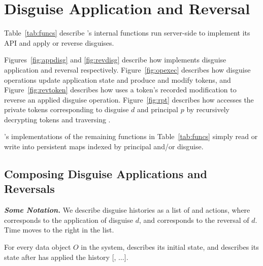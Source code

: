 \section{Disguise Application and Reversal}

Table~\ref{tab:funcs} describe \sys's internal functions run server-side to implement its API 
and apply or reverse disguises. 

Figures~\ref{fig:appdisg} and \ref{fig:revdisg} describe how \sys implements disguise application and
reversal respectively. Figure~\ref{fig:opexec} describes how disguise operations update application
state and produce and modify tokens, and 
Figure~\ref{fig:revtoken} describes how \sys uses a token's recorded
modification to reverse an applied disguise operation. 
Figure~\ref{fig:rpt} describes how \sys accesses the private tokens
corresponding to disguise $d$ and principal $p$ by recursively decrypting tokens and traversing
.

\sys's implementations of the remaining functions in Table~\ref{tab:funcs} simply read or write into
persistent maps indexed by principal and/or disguise.

\subsection{Composing Disguise Applications and Reversals}

\vspace{6pt}\noindent\textbf{\emph{Some Notation.}}
We describe disguise histories as a list of  and  actions, where  corresponds
to the application of disguise $d$, and  corresponds to the reversal of $d$. Time moves to
the right in the list.

For every data object $O$ in the system, \ostart describes its initial state, and
 describes its state after \sys has applied the history [,
$\dots$].

